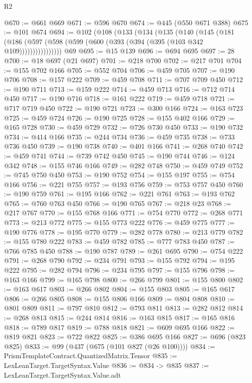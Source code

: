 \begin{lexlean}{R2}
\begin{coremodule}
@670 := @661 @669
@671 := @596 @670
@674 := @445 (@550 @671 @388)
@675 := @101 @674
@694 := @102
    (@108
      (@133
        (@134
          (@135
            (@140
              (@145
                (@181
                  (@186 (@597 (@598 (@599 (@600 (@393 (@394 (@395 (@103 @342 @109))))))))))))))))
    @69
@695 := @15 @139
@696 := @694 @695
@697 := 28
@700 := @18 @697 (@21 @697)
@701 := @218 @700
@702 := @217 @701
@704 := @155 @702 @166
@705 := @552 @704
@706 := @459 @705
@707 := @190 @706
@708 := @157 @222
@709 := @459 @708
@711 := @707 @709 @450
@712 := @190 @711
@713 := @159 @222
@714 := @459 @713
@716 := @712 @714 @450
@717 := @190 @716
@718 := @161 @222
@719 := @459 @718
@721 := @717 @719 @450
@722 := @190 @721
@723 := @300 @166
@724 := @163 @723
@725 := @459 @724
@726 := @190 @725
@728 := @155 @402 @166
@729 := @165 @728
@730 := @459 @729
@732 := @726 @730 @450
@733 := @190 @732
@734 := @414 @166
@735 := @244 @734
@736 := @459 @735
@738 := @733 @736 @450
@739 := @190 @738
@740 := @401 @166
@741 := @268 @740
@742 := @459 @741
@744 := @739 @742 @450
@745 := @190 @744
@746 := @124 @342
@748 := @155 @746 @166
@749 := @282 @748
@750 := @459 @749
@752 := @745 @750 @450
@753 := @190 @752
@754 := @155 @197
@755 := @754 @166
@756 := @221 @755
@757 := @193 @756
@759 := @753 @757 @450
@760 := @190 @759
@761 := @195 @166
@762 := @221 @761
@763 := @193 @762
@765 := @760 @763 @450
@766 := @190 @765
@767 := @218 @23
@768 := @217 @767
@770 := @155 @768 @166
@771 := @754 @770
@772 := @268 @771
@773 := @213 @772
@775 := @155 @773 @222
@776 := @459 @775
@777 := @190 @776
@778 := @195 @770
@779 := @282 @778
@780 := @213 @779
@782 := @155 @780 @222
@783 := @459 @782
@785 := @777 @783 @450
@787 := @766 @785 @450
@788 := @190 @787
@789 := @261 @695
@790 := @754 @222
@791 := @268 @790
@792 := @234 @791
@793 := @155 @792
@794 := @195 @222
@795 := @282 @794
@796 := @234 @795
@797 := @155 @796
@798 := @163 @166
@799 := @165 @798
@800 := @266 @799
@801 := @155 @800
@802 := @163 @617
@803 := @266 @802
@804 := @155 @803
@805 := @165 @617
@806 := @266 @805
@808 := @155 @806 @166
@809 := @804 @808
@810 := @801 @809
@811 := @797 @810
@812 := @793 @811
@813 := @282 @812
@814 := @268 @813
@815 := @244 @814
@816 := @163 @815
@817 := @165 @816
@818 := @789 @817
@819 := @788 @818
@821 := @609 @695 @166
@822 := @819 @821
@823 := @722 @822
@825 := @386 @695 @166
@827 := @696 (@823 @825)
@833 := @99 (@437 (@675 (@101 @827 (@26 @100))))
@834 := PrismTemplateContract.QuantizedMatrix.Tensor
@835 := LexLeanTarget.TargetSyntax.Value
@836 := @834 -> @835
@837 := LexLeanTarget.TargetSyntax.Value.adt

\end{coremodule}
\end{lexlean}
